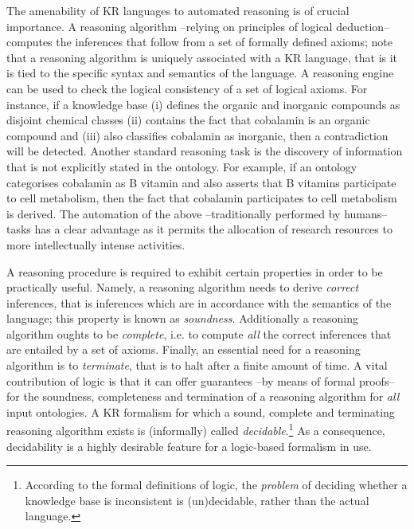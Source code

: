\documentclass[10pt]{bmc_article}
\newenvironment{bmcformat}{\baselineskip20pt\sloppy\setboolean{publ}{false}}{\baselineskip20pt\sloppy}
\begin{document}
\begin{bmcformat}
The amenability of KR languages to automated reasoning is of crucial importance. A reasoning algorithm --relying on principles of logical deduction-- computes the inferences that follow from a  set of formally defined axioms; note that a reasoning algorithm is uniquely associated with a KR language, that is it is tied to the specific syntax and semantics of the language. A reasoning engine can be used to check the logical consistency of a set of logical axioms. For instance, if a knowledge base (i) defines the organic and inorganic compounds as disjoint chemical classes (ii) contains the fact that cobalamin is an organic compound and (iii) also classifies cobalamin as inorganic, then a contradiction will be detected. Another standard reasoning task is the discovery of information that is not explicitly stated in the ontology. For example, if an ontology categorises cobalamin as B vitamin and also asserts that B vitamins participate to cell metabolism, then the fact that cobalamin participates to cell metabolism is derived. The automation of the above --traditionally performed by humans-- tasks has a clear advantage as it permits the allocation of research resources to more intellectually intense activities.

A reasoning procedure is required to exhibit certain properties in order to be practically useful. Namely, a reasoning algorithm needs to derive \emph{correct} inferences, that is inferences which are in accordance with the semantics of the language; this property is known as \emph{soundness}. Additionally a reasoning algorithm oughts to be \emph{complete}, i.e. to compute \emph{all} the correct inferences that are entailed by a set of axioms. Finally, an essential need for a reasoning algorithm is to \emph{terminate}, that is to halt after a finite amount of time. A vital contribution of logic is that it can offer guarantees --by means of formal proofs-- for the soundness, completeness and termination of a reasoning algorithm for \emph{all} input ontologies. A KR formalism for which a sound, complete and terminating reasoning algorithm exists is (informally) called \emph{decidable}.\footnote{According to the formal definitions of logic, the \emph{problem} of deciding whether a knowledge base is inconsistent is (un)decidable, rather than the actual language.} As a consequence, decidability is a highly desirable feature for a logic-based formalism in use.


\end{bmcformat}
\end{document}
